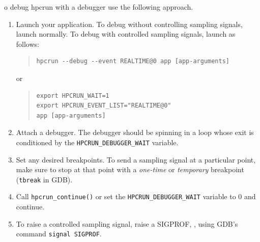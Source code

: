 \documentclass[11pt,twoside,letterpaper]{report}
\begin{document}
o debug hpcrun with a debugger use the following approach.
\begin{enumerate}

\item Launch your application.
  To debug \hpcrun{} without controlling sampling signals, launch normally.
  To debug \hpcrun{} with controlled sampling signals, launch as follows:
\begin{quote}
\begin{verbatim}
hpcrun --debug --event REALTIME@0 app [app-arguments]
\end{verbatim}
\end{quote}
or
\begin{quote}
\begin{verbatim}
export HPCRUN_WAIT=1
export HPCRUN_EVENT_LIST="REALTIME@0"
app [app-arguments]
\end{verbatim}
\end{quote}

\item Attach a debugger.
  The debugger should be spinning in a loop whose exit is conditioned by the
  \verb|HPCRUN_DEBUGGER_WAIT| variable.

\item Set any desired breakpoints.
  To send a sampling signal at a particular point, make sure to stop at that point with a \emph{one-time} or \emph{temporary} breakpoint (\texttt{tbreak} in GDB).

\item Call \verb|hpcrun_continue()| or set the \verb|HPCRUN_DEBUGGER_WAIT| variable to 0
and continue.

\item To raise a controlled sampling signal, raise a SIGPROF, \eg{}, using GDB's command \verb|signal SIGPROF|.

\end{enumerate}

\end{document}
